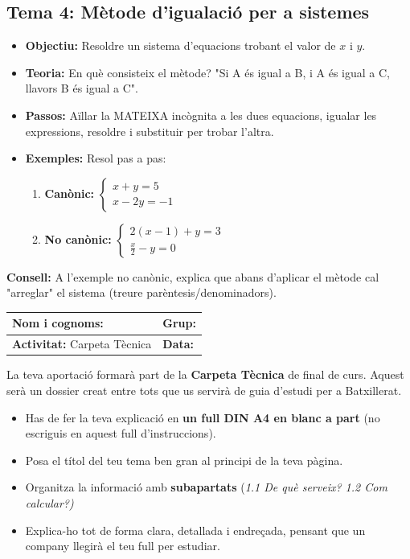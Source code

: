 \documentclass[12pt,a4paper]{article}
\newcommand{\introcomuna}{
    \begin{tcolorbox}[colback=gray!5,colframe=gray!50!black,title=\textbf{La Carpeta Tècnica de Matemàtiques}]
    La teva aportació formarà part de la \textbf{Carpeta Tècnica} de final de curs. Aquest serà un dossier creat entre tots que us servirà de guia d'estudi per a Batxillerat.
    
    \begin{itemize}[label=\textbullet, leftmargin=*]
        \item Has de fer la teva explicació en \textbf{un full DIN A4 en blanc a part} (no escriguis en aquest full d'instruccions).
        \item Posa el títol del teu tema ben gran al principi de la teva pàgina.
        \item Organitza la informació amb \textbf{subapartats} (\textit{1.1 De què serveix? 1.2 Com calcular?)}
        \item Explica-ho tot de forma clara, detallada i endreçada, pensant que un company llegirà el teu full per estudiar.
    \end{itemize}
    \end{tcolorbox}
    \vspace{0.1cm}
}
\newcommand{\capcaleraalumne}[1]{
    \begingroup
    \renewcommand{\arraystretch}{2.2}
    \begin{tabularx}{\textwidth}{|X|p{4cm}|}
    \hline
    \textbf{Nom i cognoms:} & \textbf{Grup:} \\ \hline
    \textbf{Activitat:} Carpeta Tècnica & \textbf{Data:} \\ \hline
    \end{tabularx}
    \endgroup
    \vspace{0.4cm}
}
\begin{document}
\subsection*{Tema 4: Mètode d'igualació per a sistemes}
\begin{itemize}[label=\textbullet]
    \item \textbf{Objectiu:} Resoldre un sistema d'equacions trobant el valor de $x$ i $y$.
    \item \textbf{Teoria:} En què consisteix el mètode? "Si A és igual a B, i A és igual a C, llavors B és igual a C".
    \item \textbf{Passos:} Aïllar la MATEIXA incògnita a les dues equacions, igualar les expressions, resoldre i substituir per trobar l'altra.
    \item \textbf{Exemples:} Resol pas a pas:
    \begin{enumerate}[label=\alph*)]
        \item \textbf{Canònic:} $\begin{cases} x + y = 5 \\ x - 2y = -1 \end{cases}$
        \item \textbf{No canònic:} $\begin{cases} 2(x - 1) + y = 3 \\ \displaystyle \frac{x}{2} - y = 0 \end{cases}$
    \end{enumerate}
\end{itemize}
\vfill
\noindent\textbf{Consell:} A l'exemple no canònic, explica que abans d'aplicar el mètode cal "arreglar" el sistema (treure parèntesis/denominadors).

\newpage
\capcaleraalumne{5}
\introcomuna
\end{document}
